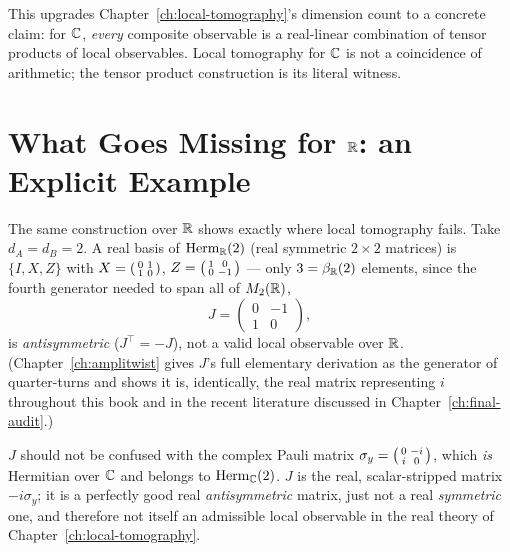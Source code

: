 \begin{remark}
This upgrades Chapter~\ref{ch:local-tomography}'s dimension count to a
concrete claim: for $\mathbb{C}$, \emph{every} composite observable is a real-linear
combination of tensor products of local observables. Local tomography for
$\mathbb{C}$ is not a coincidence of arithmetic; the tensor product construction is
its literal witness.
\end{remark}

\section{What Goes Missing for \texorpdfstring{$\mathbb{R}$}{R}: an Explicit Example}

The same construction over $\mathbb{R}$ shows exactly where local tomography fails.
Take $d_A=d_B=2$. A real basis of $\mathrm{Herm}_{\mathbb{R}}(2)$ (real symmetric
$2\times2$ matrices) is $\{I,X,Z\}$ with $X=\begin{psmallmatrix}0&1\\1&0
\end{psmallmatrix}$, $Z=\begin{psmallmatrix}1&0\\0&-1\end{psmallmatrix}$ —
only $3 = \beta_{\mathbb{R}}(2)$ elements, since the fourth generator needed to span
all of $M_2(\mathbb{R})$,
\begin{equation}
J = \begin{pmatrix} 0 & -1 \\ 1 & 0 \end{pmatrix},
\end{equation}
is \emph{antisymmetric} ($J^\top=-J$), not a valid local observable over
$\mathbb{R}$. (Chapter~\ref{ch:amplitwist} gives $J$'s full elementary derivation as
the generator of quarter-turns and shows it is, identically, the real
matrix representing $i$ throughout this book and in the recent literature
discussed in Chapter~\ref{ch:final-audit}.)

\begin{remark}
$J$ should not be confused with the complex Pauli matrix $\sigma_y =
\begin{psmallmatrix}0&-i\\i&0\end{psmallmatrix}$, which \emph{is} Hermitian
over $\mathbb{C}$ and belongs to $\mathrm{Herm}_{\mathbb{C}}(2)$. $J$ is the real,
scalar-stripped matrix $-i\sigma_y$; it is a perfectly good real
\emph{antisymmetric} matrix, just not a real \emph{symmetric} one, and
therefore not itself an admissible local observable in the real theory of
Chapter~\ref{ch:local-tomography}.
\end{remark}

